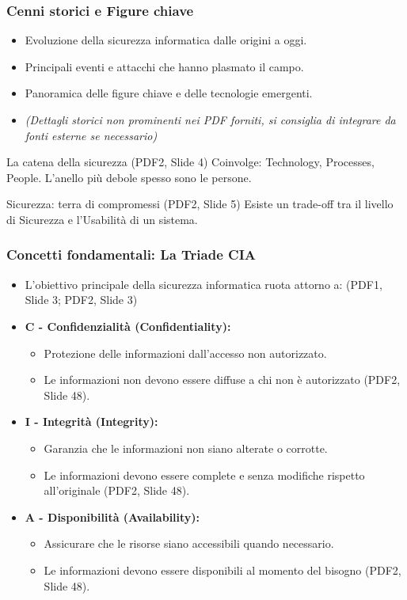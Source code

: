 \documentclass{beamer}
\begin{document}
\begin{frame}
    \frametitle{Cenni storici e Figure chiave}
    \begin{itemize}
        \item Evoluzione della sicurezza informatica dalle origini a oggi.
        \item Principali eventi e attacchi che hanno plasmato il campo.
        \item Panoramica delle figure chiave e delle tecnologie emergenti.
        \item \textit{(Dettagli storici non prominenti nei PDF forniti, si consiglia di integrare da fonti esterne se necessario)}
    \end{itemize}
    \pause
    \begin{block}{La catena della sicurezza (PDF2, Slide 4)}
        Coinvolge: Technology, Processes, People. L'anello più debole spesso sono le persone.
    \end{block}
    \pause
    \begin{block}{Sicurezza: terra di compromessi (PDF2, Slide 5)}
        Esiste un trade-off tra il livello di Sicurezza e l'Usabilità di un sistema.
    \end{block}
\end{frame}

\begin{frame}
  \frametitle{Concetti fondamentali: La Triade CIA}
  \begin{itemize}
    \item L'obiettivo principale della sicurezza informatica ruota attorno a: (PDF1, Slide 3; PDF2, Slide 3)
    \item \textbf{C - Confidenzialità (Confidentiality):}
    \begin{itemize}
        \item Protezione delle informazioni dall'accesso non autorizzato.
        \item Le informazioni non devono essere diffuse a chi non è autorizzato (PDF2, Slide 48).
    \end{itemize}
    \item \textbf{I - Integrità (Integrity):}
    \begin{itemize}
        \item Garanzia che le informazioni non siano alterate o corrotte.
        \item Le informazioni devono essere complete e senza modifiche rispetto all'originale (PDF2, Slide 48).
    \end{itemize}
    \item \textbf{A - Disponibilità (Availability):}
    \begin{itemize}
        \item Assicurare che le risorse siano accessibili quando necessario.
        \item Le informazioni devono essere disponibili al momento del bisogno (PDF2, Slide 48).
    \end{itemize}
  \end{itemize}
\end{frame}
\end{document}
